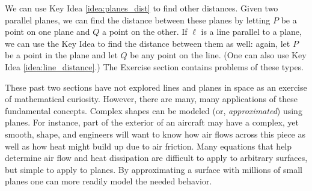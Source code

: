 We can use Key Idea \ref{idea:planes_dist} to find other distances. Given two parallel planes, we can find the distance between these planes by letting $P$ be a point on one plane and $Q$ a point on the other. If $\ell$ is a line parallel to a plane, we can use the Key Idea to find the distance between them as well: again, let $P$ be a point in the plane and let $Q$ be any point on the line. (One can also use Key Idea \ref{idea:line_distance}.) The Exercise section contains problems of these types.

\enlargethispage{2\baselineskip}
These past two sections have not explored lines and planes in space as an exercise of mathematical curiosity. However, there are many, many applications of these fundamental concepts. Complex shapes can be modeled (or, \textit{approximated}) using planes. For instance, part of the exterior of an aircraft may have a complex, yet smooth, shape, and engineers will want to know how air flows across this piece as well as how heat might build up due to air friction. Many equations that help determine air flow and heat dissipation are difficult to apply to arbitrary surfaces, but simple to apply to planes. By approximating a surface with millions of small planes one can more readily model the needed behavior.

